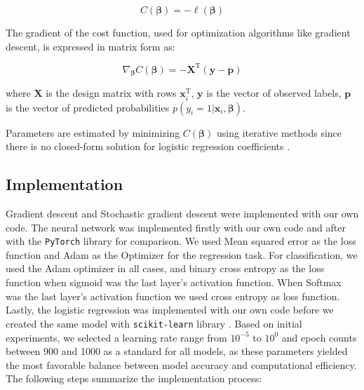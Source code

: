 \begin{equation}
    C(\boldsymbol{\beta}) = -\ell(\boldsymbol{\beta})
\end{equation}

The gradient of the cost function, used for optimization algorithms like gradient descent, is expressed in matrix form as:

\begin{equation}
    \nabla_{\boldsymbol{\beta}} C(\boldsymbol{\beta}) = -\mathbf{X}^\mathrm{T} (\boldsymbol{y} - \boldsymbol{p})
\end{equation}

where $\mathbf{X}$ is the design matrix with rows $\boldsymbol{x}_i^\mathrm{T}$,
 $\boldsymbol{y}$ is the vector of observed labels,
 $\boldsymbol{p}$ is the vector of predicted probabilities $p(y_i = 1 \vert \boldsymbol{x}_i, \boldsymbol{\beta})$.

Parameters are estimated by minimizing $C(\boldsymbol{\beta})$ using iterative methods since there is no closed-form solution for logistic regression coefficients \cite{Hjorth-Jensen_MachineLearning_2023}.


\subsection{Implementation}

Gradient descent and Stochastic gradient descent were implemented with our own code. The neural network was implemented firstly with our own code and after with the \texttt{PyTorch} library \cite{Paszke2019} for comparison. We used Mean squared error as the loss function and Adam as the Optimizer for the regression task. For classification, we used the Adam optimizer in all cases, and binary cross entropy as the loss function when sigmoid was the last layer's activation function. When Softmax was the last layer's activation function we used cross entropy as loss function. Lastly, the logistic regression was implemented with our own code before we created the same model with \texttt{scikit-learn} library \cite{scikit-learn}. Based on initial experiments, we selected a learning rate range from \( 10^{-5} \) to \( 10^0 \) and epoch counts between 900 and 1000 as a standard for all models, as these parameters yielded the most favorable balance between model accuracy and computational efficiency. The following steps summarize the implementation process:

